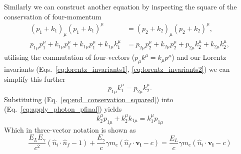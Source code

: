 \documentclass[../main.tex]{subfiles}
\begin{document}
Similarly we can construct another equation by inspecting the square of the conservation of four-momentum
\begin{align}
\left(p_{1}+k_{1}\right)_{\mu}\left(p_{1}+k_{1}\right)^{\mu} &= \left(p_{2}+k_{2}\right)_{\mu}\left(p_{2}+k_{2}\right)^{\mu}, \nonumber \\
p_{1\mu}p_{1}^{\mu}+k_{1\mu}p_{1}^{\mu}+k_{1\mu}p_{1}^{\mu}+k_{1\mu}k_{1}^{\mu} &= p_{2\mu}p_{2}^{\mu}+k_{2\mu}p_{2}^{\mu}+p_{2\mu}k_{2}^{\mu}+k_{2\mu}k_{2}^{\mu},
\label{eq:apply_conservation_squared}
\end{align}
utilising the commutation of four-vectors ($p_{\mu}k^{\mu} = k_{\mu}p^{\mu}$) and our Lorentz invariants (Eqs.~\ref{eq:lorentz_invariants1}, \ref{eq:lorentz_invariants2}) we can simplify this further 
\begin{equation}
p_{1\mu}k_{1}^{\mu} = p_{2\mu}k_{2}^{\mu}.
\label{eq:end_conservation_squared}
\end{equation}
Substituting (Eq.~\ref{eq:end_conservation_squared}) into (Eq.~\ref{eq:apply_photon_pfinal}) yields
\begin{equation}
k_{2}^{\mu}p_{1\mu}+k_{2}^{\mu}k_{1\mu} = k_{1}^{\mu}p_{1\mu}
\label{eq:substitution_four_vector}
\end{equation}
Which in three-vector notation is shown as
\begin{equation}
\frac{E_{L}E_{\gamma}}{c^{2}}\left(\hat{n}_{i}\cdot\hat{n}_{f}-1\right)+\frac{E_{\gamma}}{c}\gamma m_{e}\left(\hat{n}_{f}\cdot \boldsymbol{v_{i}}-c\right) = \frac{E_{L}}{c}\gamma m_{e}\left(\hat{n}_{i}\cdot \boldsymbol{v_{i}} -c\right)
\label{eq:three_vector_solution}
\end{equation}
\end{document}
